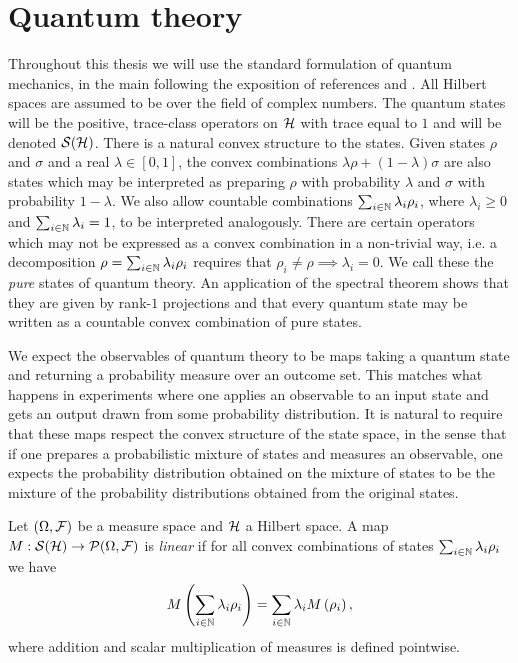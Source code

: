 \section{Quantum theory}
\label{sec:prelim-quantum}

Throughout this thesis we will use the standard formulation of quantum mechanics, in the main following the exposition of references \cite{quantum-measurement-busch-et-al} and \cite{statistical-structure-quantum-holevo}. All Hilbert spaces are assumed to be over the field of complex numbers. The quantum states will be the positive, trace-class operators on $\mathcal{H}$ with trace equal to $1$ and will be denoted $\dops[\hcal]$. There is a natural convex structure to the states. Given states $\rho$ and $\sigma$ and a real $\lambda \in[0,1]$, the convex combinations $\lambda\rho + (1-\lambda)\sigma$ are also states which may be interpreted as preparing $\rho$ with probability $\lambda$ and $\sigma$ with probability $1-\lambda$. We also allow countable combinations $\sum_{i\in\mathbb{N}}\lambda_i\rho_i$, where $\lambda_i \geq 0$ and $\sum_{i\in\mathbb{N}}\lambda_i = 1$, to be interpreted analogously. There are certain operators which may not be expressed as a convex combination in a non-trivial way, i.e. a decomposition $\rho = \sum_{i\in\mathbb{N}} \lambda_i\rho_i$ requires that $\rho_i\neq \rho \implies \lambda_i = 0$. We call these the \emph{pure} states of quantum theory. An application of the spectral theorem shows that they are given by rank-$1$ projections and that every quantum state may be written as a countable convex combination of pure states.

We expect the observables of quantum theory to be maps taking a quantum state and returning a probability measure over an outcome set. This matches what happens in experiments where one applies an observable to an input state and gets an output drawn from some probability distribution. It is natural to require that these maps respect the convex structure of the state space, in the sense that if one prepares a probabilistic mixture of states and measures an observable, one expects the probability distribution obtained on the mixture of states to be the mixture of the probability distributions obtained from the original states. 
\begin{defn}\label{defn:linear-meas-map}
  Let $(\Omega,\mathcal{F})$ be a measure space and $\mathcal{H}$ a Hilbert space. A map $M:\dops[\hcal]\to\probs{\Omega}{\fcal}$ is \emph{linear} if for all convex combinations of states $\sum_{i\in\mathbb{N}} \lambda_i \rho_i$ we have
  \begin{align}
    M\left(\sum_{i\in\mathbb{N}} \lambda_i \rho_i\right) = \sum_{i\in\mathbb{N}} \lambda_i M\left(\rho_i\right),
  \end{align}
  where addition and scalar multiplication of measures is defined pointwise.
\end{defn}

